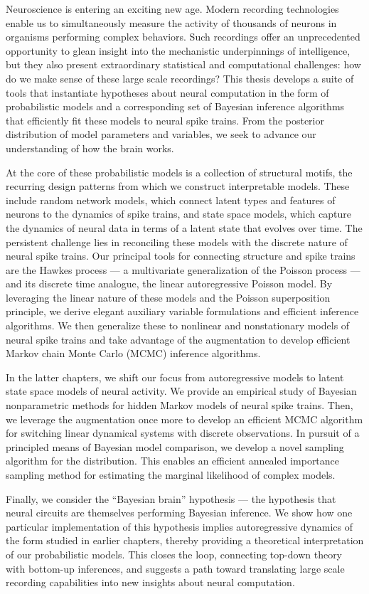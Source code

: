 Neuroscience is entering an exciting new age.  Modern recording
technologies enable us to simultaneously measure the activity of
thousands of neurons in organisms performing complex behaviors.  Such
recordings offer an unprecedented opportunity to glean insight into
the mechanistic underpinnings of intelligence, but they also present
extraordinary statistical and computational challenges: how do we make
sense of these large scale recordings?
This thesis develops a suite of tools that instantiate
hypotheses about neural computation in the form of
probabilistic models and a corresponding set of Bayesian inference
algorithms that efficiently fit these models to neural spike trains.
From the posterior distribution of model parameters and variables,
we seek to advance our understanding of how the brain works. 

At the core of these probabilistic models is a collection of
structural motifs, the recurring design patterns from which we
construct interpretable models. These include random network models,
which connect latent types and features of neurons to the dynamics of
spike trains, and state space models, which capture the dynamics of
neural data in terms of a latent state that evolves over time.  The
persistent challenge lies in reconciling these models with the
discrete nature of neural spike trains.  Our principal tools for
connecting structure and spike trains are the Hawkes process --- a
multivariate generalization of the Poisson process --- and its
discrete time analogue, the linear autoregressive Poisson model.  By
leveraging the linear nature of these models and the Poisson
superposition principle, we derive elegant auxiliary variable
formulations and efficient inference algorithms. We then generalize
these to nonlinear and nonstationary models of neural spike trains and
take advantage of the \polyagamma augmentation to develop efficient
Markov chain Monte Carlo (MCMC) inference algorithms.

In the latter chapters, we shift our focus from autoregressive models
to latent state space models of neural activity. We provide an
empirical study of Bayesian nonparametric methods for hidden Markov
models of neural spike trains. Then, we leverage
the \polyagamma augmentation once more to develop an efficient MCMC algorithm
for switching linear dynamical systems with discrete observations.  In
pursuit of a principled means of Bayesian model comparison, we develop
a novel sampling algorithm for the \polyagamma distribution. This
enables an efficient annealed importance sampling method for
estimating the marginal likelihood of complex models.

Finally, we consider the ``Bayesian brain'' hypothesis --- the
hypothesis that neural circuits are themselves performing Bayesian
inference.  We show how one particular implementation of this
hypothesis implies autoregressive dynamics of the form studied
in earlier chapters, thereby providing a theoretical interpretation of
our probabilistic models.  This closes the
loop, connecting top-down theory with bottom-up inferences, and
suggests a path toward translating large scale recording
capabilities into new insights about neural computation.


